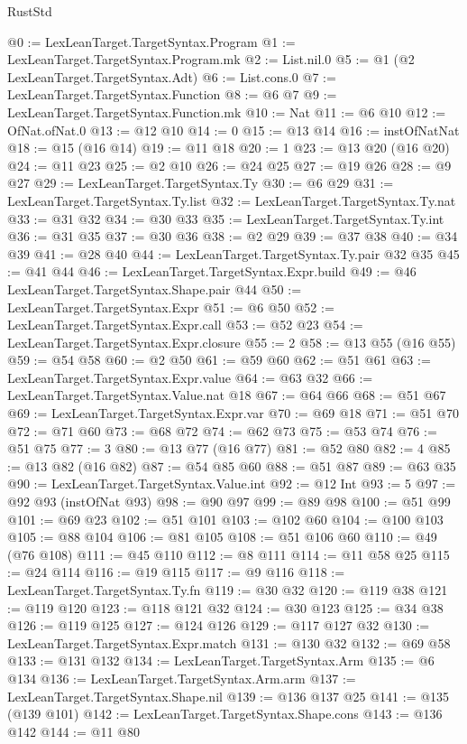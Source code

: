 \begin{lexlean}{RustStd}
\begin{coremodule}
{\begin{coremodule}
{{{{{{{{{{{@0 := LexLeanTarget.TargetSyntax.Program
@1 := LexLeanTarget.TargetSyntax.Program.mk
@2 := List.nil.{0}
@5 := @1 (@2 LexLeanTarget.TargetSyntax.Adt)
@6 := List.cons.{0}
@7 := LexLeanTarget.TargetSyntax.Function
@8 := @6 @7
@9 := LexLeanTarget.TargetSyntax.Function.mk
@10 := Nat
@11 := @6 @10
@12 := OfNat.ofNat.{0}
@13 := @12 @10
@14 := 0
@15 := @13 @14
@16 := instOfNatNat
@18 := @15 (@16 @14)
@19 := @11 @18
@20 := 1
@23 := @13 @20 (@16 @20)
@24 := @11 @23
@25 := @2 @10
@26 := @24 @25
@27 := @19 @26
@28 := @9 @27
@29 := LexLeanTarget.TargetSyntax.Ty
@30 := @6 @29
@31 := LexLeanTarget.TargetSyntax.Ty.list
@32 := LexLeanTarget.TargetSyntax.Ty.nat
@33 := @31 @32
@34 := @30 @33
@35 := LexLeanTarget.TargetSyntax.Ty.int
@36 := @31 @35
@37 := @30 @36
@38 := @2 @29
@39 := @37 @38
@40 := @34 @39
@41 := @28 @40
@44 := LexLeanTarget.TargetSyntax.Ty.pair @32 @35
@45 := @41 @44
@46 := LexLeanTarget.TargetSyntax.Expr.build
@49 := @46 LexLeanTarget.TargetSyntax.Shape.pair @44
@50 := LexLeanTarget.TargetSyntax.Expr
@51 := @6 @50
@52 := LexLeanTarget.TargetSyntax.Expr.call
@53 := @52 @23
@54 := LexLeanTarget.TargetSyntax.Expr.closure
@55 := 2
@58 := @13 @55 (@16 @55)
@59 := @54 @58
@60 := @2 @50
@61 := @59 @60
@62 := @51 @61
@63 := LexLeanTarget.TargetSyntax.Expr.value
@64 := @63 @32
@66 := LexLeanTarget.TargetSyntax.Value.nat @18
@67 := @64 @66
@68 := @51 @67
@69 := LexLeanTarget.TargetSyntax.Expr.var
@70 := @69 @18
@71 := @51 @70
@72 := @71 @60
@73 := @68 @72
@74 := @62 @73
@75 := @53 @74
@76 := @51 @75
@77 := 3
@80 := @13 @77 (@16 @77)
@81 := @52 @80
@82 := 4
@85 := @13 @82 (@16 @82)
@87 := @54 @85 @60
@88 := @51 @87
@89 := @63 @35
@90 := LexLeanTarget.TargetSyntax.Value.int
@92 := @12 Int
@93 := 5
@97 := @92 @93 (instOfNat @93)
@98 := @90 @97
@99 := @89 @98
@100 := @51 @99
@101 := @69 @23
@102 := @51 @101
@103 := @102 @60
@104 := @100 @103
@105 := @88 @104
@106 := @81 @105
@108 := @51 @106 @60
@110 := @49 (@76 @108)
@111 := @45 @110
@112 := @8 @111
@114 := @11 @58 @25
@115 := @24 @114
@116 := @19 @115
@117 := @9 @116
@118 := LexLeanTarget.TargetSyntax.Ty.fn
@119 := @30 @32
@120 := @119 @38
@121 := @119 @120
@123 := @118 @121 @32
@124 := @30 @123
@125 := @34 @38
@126 := @119 @125
@127 := @124 @126
@129 := @117 @127 @32
@130 := LexLeanTarget.TargetSyntax.Expr.match
@131 := @130 @32
@132 := @69 @58
@133 := @131 @132
@134 := LexLeanTarget.TargetSyntax.Arm
@135 := @6 @134
@136 := LexLeanTarget.TargetSyntax.Arm.arm
@137 := LexLeanTarget.TargetSyntax.Shape.nil
@139 := @136 @137 @25
@141 := @135 (@139 @101)
@142 := LexLeanTarget.TargetSyntax.Shape.cons
@143 := @136 @142
@144 := @11 @80
}}}}}}}}}}}
\end{coremodule}}
\end{coremodule}
\end{lexlean}
